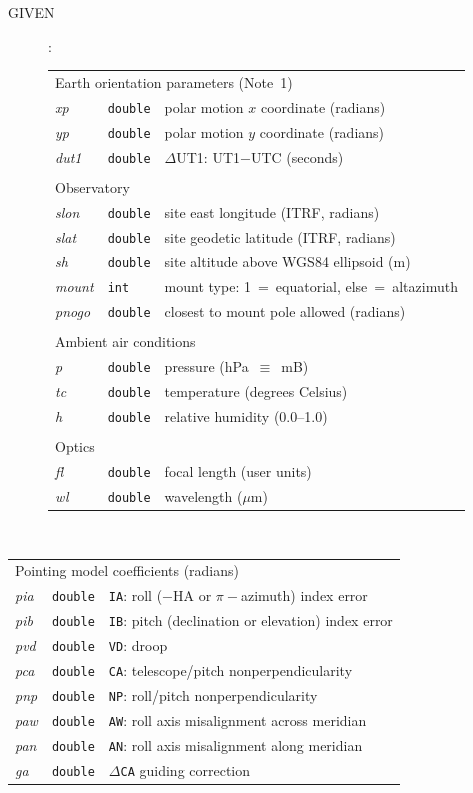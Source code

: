\documentclass[11pt,fleqn,twoside,\paper]{article}
\renewcommand{\_}{{\tt\char'137}}     %
\newcommand{\args}[2]
{
  \goodbreak
  \begin{description}
  \item[#1]: \\[1.5ex] \nopagebreak
    \hspace*{-0.9em}
    \begin{tabular}{p{4.5em}p{5.8em}p{24em}}
      #2
    \end{tabular}
  \end{description}
  \vspace{-3ex}
}
\newcommand{\breakargs}[1]
{
  \goodbreak
  \vfill
  \begin{description}
  \item ~ \\[1.5ex] \nopagebreak
    \hspace*{-0.9em}
    \begin{tabular}{p{4.5em}p{5.8em}p{24em}}
      #1
    \end{tabular}
  \end{description}
  \vspace{-3ex}
}
\newcommand{\specsubhead}[1]
{
  \multicolumn{3}{l}{\hspace*{-1.5em} #1 \vspace{0.5ex}}
}
\newcommand{\spec}[3]
{
  {\em {#1}} & {\tt \mbox{#2}} & {#3}
}
\begin{document}
\args{GIVEN}{
\specsubhead{Earth orientation parameters (Note~1)} \\
\spec{xp}{double}{polar motion $x$ coordinate (radians)} \\
\spec{yp}{double}{polar motion $y$ coordinate (radians)} \\
\spec{dut1}{double}{$\Delta$UT1: UT1$-$UTC (seconds)} \\
\\
\specsubhead{Observatory} \\
\spec{slon}{double}{site east longitude (ITRF, radians)} \\
\spec{slat}{double}{site geodetic latitude (ITRF, radians)} \\
\spec{sh}{double}{site altitude above WGS84 ellipsoid (m)} \\
\spec{mount}{int}{mount type:  1~=~equatorial, else~=~altazimuth} \\
\spec{pnogo}{double}{closest to mount pole allowed (radians)} \\
\\
\specsubhead{Ambient air conditions} \\
\spec{p }{double}{pressure (hPa~$\equiv$~mB)} \\
\spec{tc}{double}{temperature (degrees Celsius)} \\
\spec{h }{double}{relative humidity (0.0--1.0)} \\
\\
\specsubhead{Optics} \\
\spec{fl}{double}{focal length (user units)} \\
\spec{wl}{double}{wavelength ($\mu$m)} \\
}\breakargs{
\specsubhead{Pointing model coefficients (radians)} \\
\spec{pia}{double}
                {{\tt IA}: roll ($-$HA or $\pi-$azimuth) index error} \\
\spec{pib}{double}
             {{\tt IB}: pitch (declination or elevation) index error} \\
\spec{pvd}{double}{{\tt VD}: droop} \\
\spec{pca}{double}{{\tt CA}: telescope/pitch nonperpendicularity} \\
\spec{pnp}{double}{{\tt NP}: roll/pitch nonperpendicularity} \\
\spec{paw}{double}{{\tt AW}: roll axis misalignment across meridian} \\
\spec{pan}{double}{{\tt AN}: roll axis misalignment along meridian} \\
\spec{ga}{double}{$\Delta${\tt CA} guiding correction} \\
}
\end{document}
